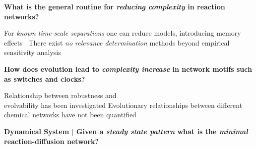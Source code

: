 \documentclass[a0,portrait]{a0poster}
\begin{document}
\begin{multicols}{2}

\begin{tcolorbox}[boxrule=2pt,arc=3.4pt,boxsep=2mm]
	\begin{center}
		\textbf{
		What is the general routine for \textit{reducing complexity} in reaction networks?}
	\end{center}
\end{tcolorbox}

\begin{itemize}[leftmargin=5cm]
	\up For \textit{known time-scale separations} one can reduce models, introducing memory effects~\cite{Phillies2000ProjectionFormalism}
	\down There exist \textit{no relevance determination} methods beyond
	empirical sensitivity analysis~\cite{Cardelli2016NoiseSwitches}
\end{itemize}

\vfill
\columnbreak

\begin{tcolorbox}[boxrule=2pt,arc=3.4pt,boxsep=2mm]
	\begin{center}
		\textbf{
		How does evolution lead to \textit{complexity increase} in network motifs such as switches and clocks?}
	\end{center}
\end{tcolorbox}

\begin{itemize}[leftmargin=5cm]
	\up Relationship between robustness and \\evolvability has been investigated \cite{Daniels2008SloppinessBiology}
	\down Evolutionary relationships between different chemical networks have not been quantified
\end{itemize}

\vfill
\end{multicols}
\vspace{1cm}

\begin{tcolorbox}[boxrule=2pt,arc=3.4pt,boxsep=2mm]
	\begin{center}
		\textbf{\color{Grey}Dynamical System \color{Black}$|$
		Given a \textit{steady state pattern} what is the \textit{minimal} reaction-diffusion network?}
	\end{center}
\end{tcolorbox}
\end{document}
